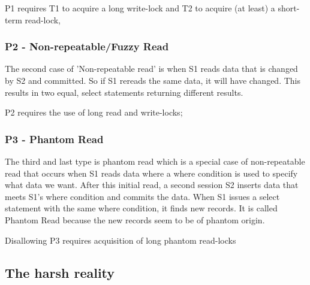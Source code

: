 \documentclass[a4paper,10pt,titlepage]{report}
\begin{document}
     P1 requires T1 to acquire a long write-lock and T2 to acquire (at least) a short-term read-lock,


    \subsubsection{P2 - Non-repeatable/Fuzzy Read}

   
    The second case of 'Non-repeatable read' is when S1 reads data that is changed by S2 and committed. So if S1 rereads the same data, it will have changed. This results in two equal, select statements returning different results.
    
     P2 requires the use of long read and write-locks; 


    \subsubsection{P3 - Phantom Read}

    The third and last type is phantom read which is a special case of non-repeatable read that occurs when S1 reads data where a where condition is used to specify what data we want. After this initial read, a second session S2 inserts data that meets S1's where condition and commits the data. When S1 issues a select statement with the same where condition, it finds new records. It is called Phantom Read because the new records seem to be of phantom origin.
    
    Disallowing P3 requires acquisition of long phantom read-locks

    
\newpage
\subsection{The harsh reality}
    
\end{document}
